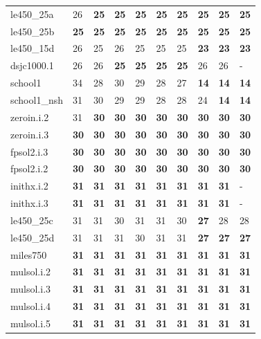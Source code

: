 \documentclass[12pt,a4paper,twoside]{scrartcl}
\numberwithin{equation}{section}
\begin{document}
\begin{table}[!htbp]
\begin{tabular}{|p{2.5cm} |p{1cm} p{1cm} p{1cm} p{1cm} p{1cm} p{1cm} p{1.8cm} p{1cm} p{1cm}|}
le450\_25a&26&\textbf{25}&\textbf{25}&\textbf{25}&\textbf{25}&\textbf{25}&\textbf{25}&\textbf{25}&\textbf{25}\\
le450\_25b&\textbf{25}&\textbf{25}&\textbf{25}&\textbf{25}&\textbf{25}&\textbf{25}&\textbf{25}&\textbf{25}&\textbf{25}\\ 
le450\_15d&26&25&26&25&25&25&\textbf{23}&\textbf{23}&\textbf{23}\\ 
dsjc1000.1&26&26&\textbf{25}&\textbf{25}&\textbf{25}&\textbf{25}&26&26&-\\ 
school1&34&28&30&29&28&27&\textbf{14}&\textbf{14}&\textbf{14}\\ \hline
school1\_nsh&31&30&29&29&28&28&24&\textbf{14}&\textbf{14}\\
zeroin.i.2&31&\textbf{30}&\textbf{30}&\textbf{30}&\textbf{30}&\textbf{30}&\textbf{30}&\textbf{30}&\textbf{30}\\
zeroin.i.3&\textbf{30}&\textbf{30}&\textbf{30}&\textbf{30}&\textbf{30}&\textbf{30}&\textbf{30}&\textbf{30}&\textbf{30}\\ 
fpsol2.i.3&\textbf{30}&\textbf{30}&\textbf{30}&\textbf{30}&\textbf{30}&\textbf{30}&\textbf{30}&\textbf{30}&\textbf{30}\\ 
fpsol2.i.2&\textbf{30}&\textbf{30}&\textbf{30}&\textbf{30}&\textbf{30}&\textbf{30}&\textbf{30}&\textbf{30}&\textbf{30}\\  \hline
inithx.i.2&\textbf{31}&\textbf{31}&\textbf{31}&\textbf{31}&\textbf{31}&\textbf{31}&\textbf{31}&\textbf{31}&-\\ 
inithx.i.3&\textbf{31}&\textbf{31}&\textbf{31}&\textbf{31}&\textbf{31}&\textbf{31}&\textbf{31}&\textbf{31}&-\\ 
le450\_25c&31&31&30&31&31&30&\textbf{27}&28&28\\
le450\_25d&31&31&31&30&31&31&\textbf{27}&\textbf{27}&\textbf{27}\\
miles750&\textbf{31}&\textbf{31}&\textbf{31}&\textbf{31}&\textbf{31}&\textbf{31}&\textbf{31}&\textbf{31}&\textbf{31}\\\hline
mulsol.i.2&\textbf{31}&\textbf{31}&\textbf{31}&\textbf{31}&\textbf{31}&\textbf{31}&\textbf{31}&\textbf{31}&\textbf{31}\\ 
mulsol.i.3&\textbf{31}&\textbf{31}&\textbf{31}&\textbf{31}&\textbf{31}&\textbf{31}&\textbf{31}&\textbf{31}&\textbf{31}\\
mulsol.i.4&\textbf{31}&\textbf{31}&\textbf{31}&\textbf{31}&\textbf{31}&\textbf{31}&\textbf{31}&\textbf{31}&\textbf{31}\\ 
mulsol.i.5&\textbf{31}&\textbf{31}&\textbf{31}&\textbf{31}&\textbf{31}&\textbf{31}&\textbf{31}&\textbf{31}&\textbf{31}\\ 

\end{tabular}
\end{table}
\end{document}
